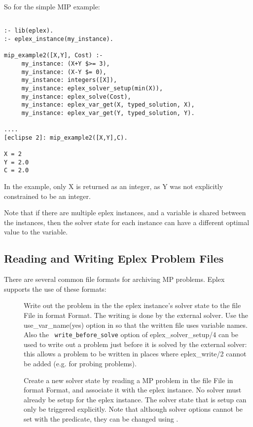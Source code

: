 So for the simple MIP example:
\begin{verbatim}

:- lib(eplex).
:- eplex_instance(my_instance).

mip_example2([X,Y], Cost) :-
     my_instance: (X+Y $>= 3),
     my_instance: (X-Y $= 0),
     my_instance: integers([X]),
     my_instance: eplex_solver_setup(min(X)),
     my_instance: eplex_solve(Cost),
     my_instance: eplex_var_get(X, typed_solution, X),
     my_instance: eplex_var_get(Y, typed_solution, Y).

....
[eclipse 2]: mip_example2([X,Y],C).

X = 2
Y = 2.0
C = 2.0

\end{verbatim}

In the example, only X is returned as an integer, as Y was not explicitly
constrained to be an integer.

Note that if there are multiple eplex instances, and a variable is shared
between the instances, then the solver state for each instance can have a
different optimal value to the variable.

\subsection{Reading and Writing Eplex Problem Files}
There are several common file formats for archiving MP problems. Eplex
supports the use of these formats:

\begin{sloppypar}

\begin{description}

\item[]
Write out the problem in the the eplex instance's solver state to the file
File in format Format. The writing is done by the external solver. Use the
use_var_name(yes) option in
so that the written file uses \eclipse variable names. Also the {\tt
write_before_solve} option of eplex_solver_setup/4 can be used to write out
a problem just before it is solved by the external solver: this allows
a problem to be written in places where eplex_write/2 cannot be added
(e.g. for probing problems).

\item[]
Create a new solver state by reading a MP problem in the file File in format
Format, and associate it with the eplex instance. No solver must already be
setup for the eplex instance. The solver state that is setup can only be
triggered explicitly. Note that although solver options cannot be set with
the predicate, they can be changed using
.

\end{description}
\end{sloppypar}

